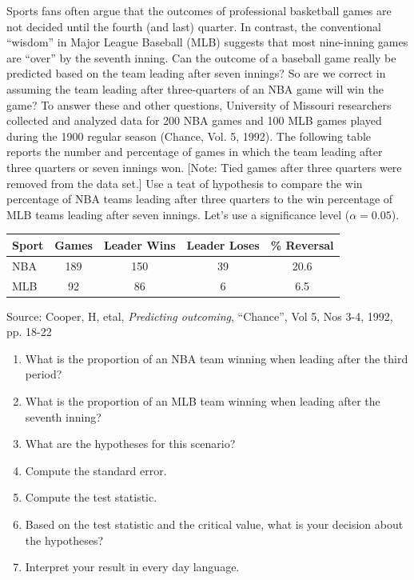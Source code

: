 \documentclass[11pt, chapterprefix=true]{scrbook}\usepackage[]{graphicx}\usepackage[]{color}
\begin{document}
\begin{exercises}
\begin{exercise}
Sports fans often argue that the outcomes of professional basketball games are not decided until the fourth (and last) quarter. In contrast, the conventional ``wisdom'' in Major League Baseball (MLB) suggests that most nine-inning games are “over” by the seventh inning. Can the outcome of a baseball game really be predicted based on the team leading after seven innings? So are we correct in assuming the team leading after three-quarters of an NBA game will win the game? To answer these and other questions, University of Missouri researchers collected and analyzed data for 200 NBA games and 100 MLB games played during the 1900 regular season (Chance, Vol. 5, 1992). The following table reports the number and percentage of games in which the team leading after three quarters or seven innings won. [Note: Tied games after three quarters were removed from the data set.] Use a teat of hypothesis to compare the win percentage of NBA teams leading after three quarters to the win percentage of MLB teams leading after seven innings. Let’s use a significance level ($\alpha = 0.05$).

\begin{center}				
\begin{tabular}{@{} lcccc @{}} \hline				
Sport & Games & Leader Wins & Leader Loses & \% Reversal \\ \hline
NBA & 189 & 150 & 39 & 20.6 \\
MLB & 92  & 86  & 6 & 6.5   \\ \hline
\end{tabular}
\end{center} 
\vspace{-1mm}
Source: Cooper, H, etal, \textit{Predicting outcoming}, ``Chance'', Vol 5, Nos 3-4, 1992, pp. 18-22

\begin{enumerate}
\item  What is the proportion of an NBA team winning when leading after the third period?
\item  What is the proportion of an MLB team winning when leading after the seventh inning?
\item  What are the hypotheses for this scenario?
\item  Compute the standard error.
\item  Compute the test statistic.
\item  Based on the test statistic and the critical value, what is your decision about the hypotheses?
\item  Interpret your result in every day language.
\end{enumerate} 


\end{exercise}
\end{exercises}
\end{document}
